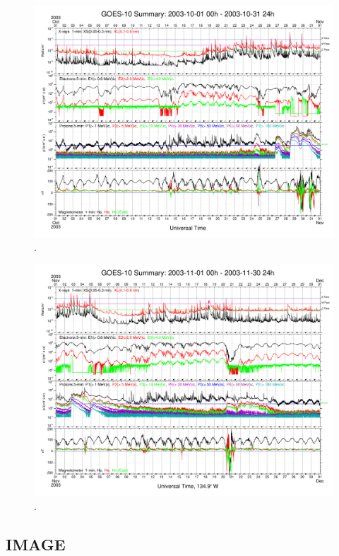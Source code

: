 \begin{figure}[H]
\centering
\includegraphics[page=1, width=.79\textwidth]{figures/goes10_oct.pdf}

\caption{\cite{ngdc-noaa}.}
\label{fig:goes_sem_data_oct}
\end{figure}

\begin{figure}[H]
\centering
\includegraphics[page=1, width=.79\textwidth]{figures/goes10_nov.pdf}

\caption{\cite{ngdc-noaa}.}
\label{fig:goes_sem_data_nov}
\end{figure}


\subsection{IMAGE}


